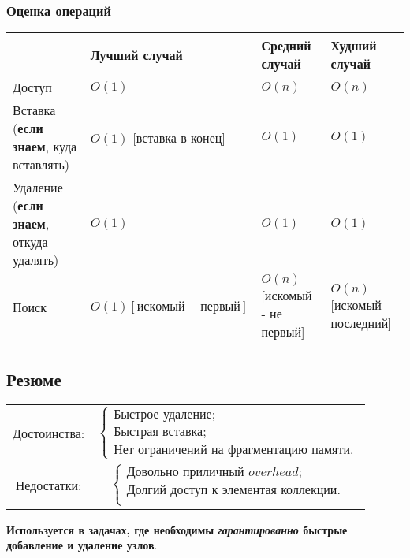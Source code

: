 \subsubsection{Оценка операций}
\begin{tabular}{|p{3cm}|p{3cm}|p{3cm}|p{3cm}|}
\hline
     & Лучший случай & Средний случай&Худший случай \\
\hline
    Доступ & $O(1)$ & $O(n)$ & $O(n)$\\
\hline
    Вставка (\textbf{если знаем}, куда вставлять) & $O(1)$ [вставка в конец]& $O(1)$  & $O(1)$  \\
\hline
    Удаление (\textbf{если знаем}, откуда удалять) & $O(1)$ & $O(1)$ & $O(1)$\\
\hline
    Поиск & $O(1)[искомый - первый]$ & $O(n)$ [искомый - не первый] & $O(n)$ [искомый - последний]\\
\hline
\end{tabular}

\subsection{Резюме}
\begin{tabular}{cp{10cm}}
    Достоинства: &
        \begin{equation*}
            \begin{cases}
                \text{Быстрое удаление};\\
                \text{Быстрая вставка};\\
                \text{Нет ограничений на фрагментацию памяти}.
            \end{cases}
        \end{equation*} \\
    Недостатки:&  
        \begin{equation*}
            \begin{cases}
                \text{Довольно приличный }overhead;\\
                \text{Долгий доступ к элементая коллекции.}\\
            \end{cases}
        \end{equation*} 
\end{tabular}

\textbf{Используется в задачах, где необходимы \textit{гарантированно} быстрые добавление и удаление узлов}.